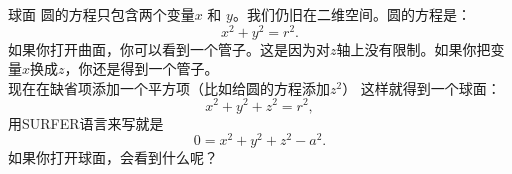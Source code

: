 ﻿\begin{surferPage}{球面}
圆的方程只包含两个变量$x$ 和 $y$。我们仍旧在二维空间。圆的方程是：
\[x^2+y^2=r^2.\]
如果你打开曲面，你可以看到一个管子。这是因为对$z$轴上没有限制。如果你把变量$x$换成$z$，你还是得到一个管子。\\
现在在缺省项添加一个平方项（比如给圆的方程添加$z^2$）
这样就得到一个球面：
\[x^2+y^2+z^2=r^2,\]
用SURFER语言来写就是
\[0=x^2+y^2+z^2-a^2.\]
如果你打开球面，会看到什么呢？
\end{surferPage}
